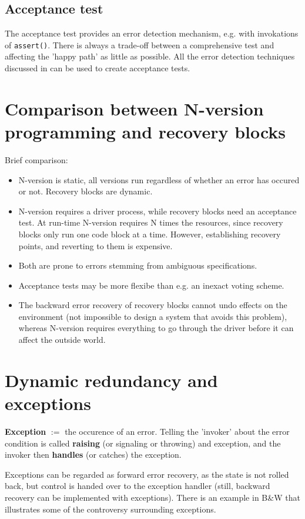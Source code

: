\subsection{Acceptance test}
The acceptance test provides an error detection mechanism, e.g. with invokations of \texttt{assert()}. There is always a trade-off between a comprehensive test and affecting the 'happy path' as little as possible. All the error detection techniques discussed in  can be used to create acceptance tests.

\section{Comparison between N-version programming and recovery blocks}
Brief comparison:
\begin{itemize}
    \item N-version is static, all versions run regardless of whether an error has occured or not. Recovery blocks are dynamic.
    \item N-version requires a driver process, while recovery blocks need an acceptance test. At run-time N-version requires N times the resources, since recovery blocks only run one code block at a time. However, establishing recovery points, and reverting to them is expensive.
    \item Both are prone to errors stemming from ambiguous specifications.
    \item Acceptance tests may be more flexibe than e.g. an inexact voting scheme. 
    \item The backward error recovery of recovery blocks cannot undo effects on the environment (not impossible to design a system that avoids this problem), whereas N-version requires everything to go through the driver before it can affect the outside world.
\end{itemize}

\section{Dynamic redundancy and exceptions}
\textbf{Exception} $:=$ the occurence of an error. Telling the 'invoker' about the error condition is called \textbf{raising} (or signaling or throwing) and exception, and the invoker then \textbf{handles} (or catches) the exception. 

Exceptions can be regarded as forward error recovery, as the state is not rolled back, but control is handed over to the exception handler (still, backward recovery can be implemented with exceptions). There is an example in B\&W that illustrates some of the controversy surrounding exceptions.